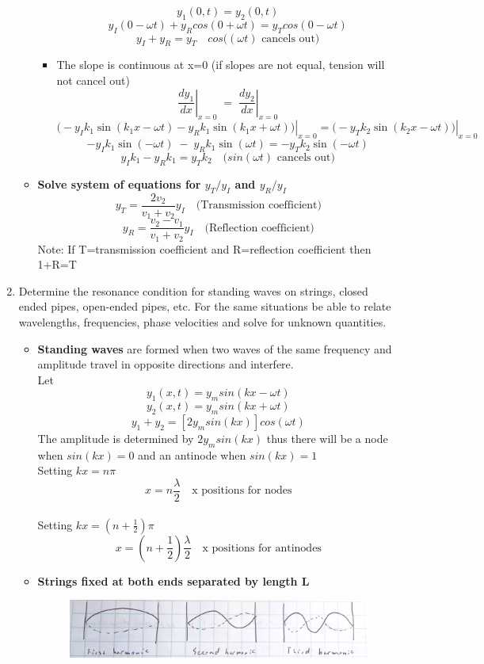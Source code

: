 \documentclass[12pt]{article}
\begin{document}
\begin{enumerate}
\begin{itemize}
\begin{itemize}
    \[y_1(0,t)=y_2(0,t)\]
    \[y_I(0-\omega t)+y_Rcos(0+\omega t)=y_Tcos(0-\omega t)\]
    \[y_I+y_R=y_T \quad \text{$cos((\omega t)$ cancels out)}\]
    \item The slope is continuous at x=0 (if slopes are not equal, tension will not cancel out)
    \[\left.\frac{dy_1}{dx}\right|_{x=0} \;=\; \left.\frac{dy_2}{dx}\right|_{x=0}\]
    \[
\left. \bigl(- y_I k_1 \sin(k_1 x - \omega t) - y_R k_1 \sin(k_1 x + \omega t)\bigr) \right|_{x=0}
=
\left. \bigl(- y_T k_2 \sin(k_2 x - \omega t)\bigr) \right|_{x=0}
\]
\[
- y_I k_1 \sin(-\omega t) \;-\; y_R k_1 \sin(\omega t) 
= - y_T k_2 \sin(-\omega t)
\]
\[y_Ik_1-y_Rk_1=y_Tk_2 \quad \text{($sin(\omega t)$ cancels out)}\]   
    \end{itemize}
\item \textbf{Solve system of equations for $y_T/y_I$ and $y_R/y_I$}
\[\boxed{y_T=\frac{2v_2}{v_1+v_2}y_I \quad \text{(Transmission coefficient)}}\]
\[\boxed{y_R=\frac{v_2-v_1}{v_1+v_2}y_I \quad \text{(Reflection coefficient)}}\]
Note: If T=transmission coefficient and R=reflection coefficient then 1+R=T
\end{itemize}
    \item Determine the resonance condition for standing waves on strings, closed ended pipes, open-ended pipes, etc. For the same situations be able to relate wavelengths, frequencies, phase velocities and solve for unknown quantities.
\begin{itemize}
    \item \textbf{Standing waves} are formed when two waves of the same frequency and amplitude travel in opposite directions and interfere.
    \\Let
    \[y_1(x,t)=y_msin(kx-\omega t)\]
    \[y_2(x,t)=y_msin(kx+\omega t)\]
    \[y_1+y_2 = [2y_msin(kx)]cos(\omega t)\]
    The amplitude is determined by $2y_msin(kx)$ thus there will be a node when $sin(kx)=0$ and an antinode when $sin(kx)=1$
    \\ Setting $kx=n\pi$
    \[x=n \frac{\lambda}{2} \quad \text{x positions for nodes}\]
    \\ Setting $kx=(n+\frac{1}{2})\pi$
    \[x=\left(n+\frac{1}{2}\right)\frac{\lambda}{2} \quad \text{x positions for antinodes}\]
    \item \textbf{Strings fixed at both ends separated by length L}
    \begin{figure}[H]
    \centering
    \includegraphics[width=1\textwidth]{String Harmonics.jpg}

\end{figure}
\end{itemize}
\end{enumerate}
\end{document}
